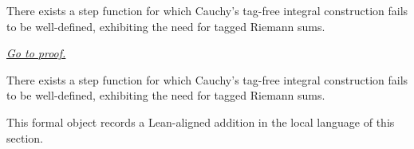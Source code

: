 \begin{dependencies}
\NoLocalDependencies
\end{dependencies}
\begin{theorem}
\label{thm:cauchy-step-function-failure-witness}
There exists a step function for which Cauchy's tag-free integral construction fails to be well-defined, exhibiting the need for tagged Riemann sums.

\smallskip
\noindent
\hyperref[prf:cauchy-step-function-failure-witness]{\textit{Go to proof.}}
\end{theorem}

\begin{remark*}
There exists a step function for which Cauchy's tag-free integral construction fails to be well-defined, exhibiting the need for tagged Riemann sums.
\end{remark*}

\begin{remark*}[Interpretation]
This formal object records a Lean-aligned addition in the local language of this section.
\end{remark*}

\begin{dependencies}
\NoLocalDependencies
\end{dependencies}

